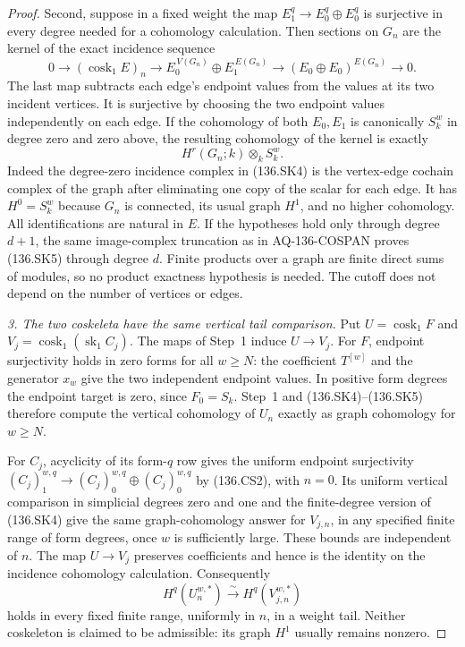 \begin{proof}
Second, suppose in a fixed weight the map
$E_1^q\to E_0^q\oplus E_0^q$ is surjective in every degree
needed for a cohomology calculation. Then sections on
$G_n$ are the kernel of the exact incidence sequence
\[
 0\longrightarrow(\operatorname{cosk}_1E)_n
 \longrightarrow E_0^{\,V(G_n)}\oplus E_1^{\,E(G_n)}
 \longrightarrow (E_0\oplus E_0)^{E(G_n)}
 \longrightarrow0.                                      \tag{136.SK4}
\]
The last map subtracts each edge's endpoint values from the
values at its two incident vertices. It is surjective by
choosing the two endpoint values independently on each edge.
If the cohomology of both $E_0,E_1$ is canonically $S_k^w$
in degree zero and zero above, the resulting cohomology of
the kernel is exactly
\[
                 H^r(G_n;k)\otimes_k S_k^w.                \tag{136.SK5}
\]
Indeed the degree-zero incidence complex in (136.SK4) is
the vertex-edge cochain complex of the graph after eliminating
one copy of the scalar for each edge. It has $H^0=S_k^w$
because $G_n$ is connected, its usual graph $H^1$, and no
higher cohomology. All identifications are natural in $E$.
If the hypotheses hold only through degree $d+1$, the same
image-complex truncation as in AQ-136-COSPAN proves (136.SK5)
through degree $d$. Finite products over a graph are finite
direct sums of modules, so no product exactness hypothesis is
needed. The cutoff does not depend on the number of vertices
or edges.

\emph{3. The two coskeleta have the same vertical tail comparison.}
Put $U=\operatorname{cosk}_1F$ and
$V_j=\operatorname{cosk}_1(\operatorname{sk}_1 C_j)$.
The maps of Step~1 induce $U\to V_j$.
For $F$, endpoint surjectivity holds in zero forms for all
$w\ge N$: the coefficient $T^{[w]}$ and the generator
$x_w$ give the two independent endpoint values. In positive
form degrees the endpoint target is zero, since $F_0=S_k$.
Step~1 and (136.SK4)--(136.SK5) therefore compute the vertical
cohomology of $U_n$ exactly as graph cohomology for $w\ge N$.

For $C_j$, acyclicity of its form-$q$ row gives the uniform
endpoint surjectivity $(C_j)_1^{w,q}\to
(C_j)_0^{w,q}\oplus(C_j)_0^{w,q}$ by (136.CS2), with $n=0$.
Its uniform vertical comparison in simplicial degrees zero
and one and the finite-degree version of (136.SK4) give the
same graph-cohomology answer for $V_{j,n}$, in any specified
finite range of form degrees, once $w$ is sufficiently large.
These bounds are independent of $n$.
The map $U\to V_j$ preserves coefficients and hence is the
identity on the incidence cohomology calculation. Consequently
\[
      H^q(U_n^{w,*})\xrightarrow{\sim} H^q(V_{j,n}^{w,*})
                                                               \tag{136.SK6}
\]
holds in every fixed finite range, uniformly in $n$, in a
weight tail. Neither coskeleton is claimed to be admissible:
its graph $H^1$ usually remains nonzero.


\end{proof}
